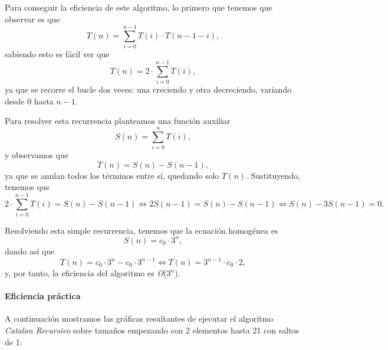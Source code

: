 \documentclass[a4paper,12pt]{article} %
\begin{document}
Para conseguir la eficiencia de este algoritmo, lo primero que tenemos que observar es que
\[
	T(n) = \sum_{i=0}^{n-1} T(i) \cdot T(n-1-i),
\]
sabiendo esto es fácil ver que
\[
	T(n) = 2 \cdot \sum_{i=0}^{n-1} T(i),
\]
ya que se recorre el bucle dos veces: una creciendo y otra decreciendo, variando desde 0 hasta \(n-1\).

Para resolver esta recurrencia planteamos una función auxiliar
\[
	S(n) = \sum_{i=0}^{n} T(i),
\]
y observamos que
\[
	T(n) = S(n) - S(n-1),
\]
ya que se anulan todos los términos entre sí, quedando solo \(T(n)\). Sustituyendo, tenemos que
\[
	2 \cdot \sum_{i=0}^{n-1} T(i) = S(n) - S(n-1) \Longleftrightarrow 2S(n-1) = S(n) - S(n-1) \Longleftrightarrow S(n) - 3S(n-1) = 0.
\]

Resolviendo esta simple recurrencia, tenemos que la ecuación homogénea es
\[
	S(n) = c_{0} \cdot 3^{n},
\]
dando así que
\[
	T(n) = c_{0} \cdot 3^{n} - c_{0} \cdot 3^{n-1} \Longleftrightarrow T(n) = 3^{n-1} \cdot c_{0} \cdot 2,
\]
y, por tanto, la eficiencia del algoritmo es \textit{O}(\(3^{n}\)).


\paragraph{Eficiencia práctica}

A continuación mostramos las gráficas resultantes de ejecutar el algoritmo \textit{Catalan Recursivo}
sobre tamaños empezando con 2 elementos hasta 21 con saltos de 1:
\end{document}
